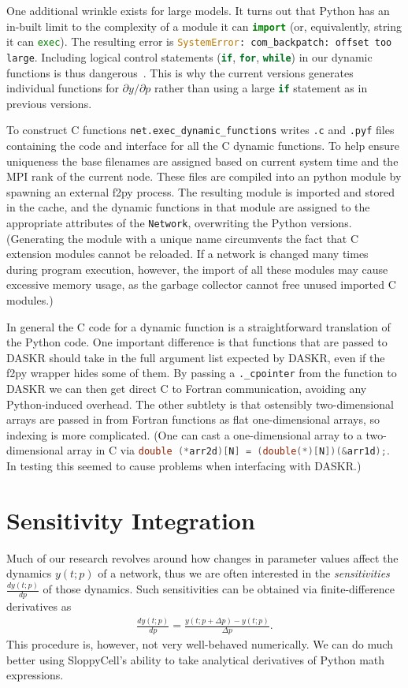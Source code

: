 \documentclass[12pt]{article}
\makeatletter
\newcommand{\py}[1]{\lstinline[language=Python, showstringspaces=False]@#1@}
\newcommand{\ccode}[1]{\lstinline[language=C, showstringspaces=False]!#1!}
\newcommand{\filename}[1]{\texttt{#1}}
\makeatother
\begin{document}
One additional wrinkle exists for large models.
It turns out that Python has an in-built limit to the complexity of a module it can \py{import} (or, equivalently, string it can \py{exec}).
The resulting error is \py{SystemError: com_backpatch: offset too large}.
Including logical control statements (\py{if}, \py{for}, \py{while}) in our dynamic functions is thus dangerous~\cite{bib:Reedy2006}.
This is why the current versions generates individual functions for $\partial y/\partial p$ rather than using a large \py{if} statement as in previous versions.

To construct C functions \py{net.exec_dynamic_functions} writes \filename{.c} and \filename{.pyf} files containing the code and interface for all the C dynamic functions.
To help ensure uniqueness the base filenames are assigned based on current system time and the MPI rank of the current node.
These files are compiled into an python module by spawning an external f2py process.
The resulting module is imported and stored in the cache, and the dynamic functions in that module are assigned to the appropriate attributes of the \py{Network}, overwriting the Python versions.
(Generating the module with a unique name circumvents the fact that C extension modules cannot be reloaded.
If a network is changed many times during program execution, however, the import of all these modules may cause excessive memory usage, as the garbage collector cannot free unused imported C modules.)

In general the C code for a dynamic function is a straightforward translation of the Python code.
One important difference is that functions that are passed to DASKR should take in the full argument list expected by DASKR, even if the f2py wrapper hides some of them.
By passing a \py{._cpointer} from the function to DASKR we can then get direct C to Fortran communication, avoiding any Python-induced overhead.
The other subtlety is that ostensibly two-dimensional arrays are passed in from Fortran functions as flat one-dimensional arrays, so indexing is more complicated.
(One can cast a one-dimensional array to a two-dimensional array in C via  \ccode{double (*arr2d)[N] = (double(*)[N])(&arr1d);}.
In testing this seemed to cause problems when interfacing with DASKR.)

\section{Sensitivity Integration}
Much of our research revolves around how changes in parameter values affect the dynamics $y(t; p)$ of a network, thus we are often interested in the \emph{sensitivities} $\frac{d y(t; p)}{dp}$ of those dynamics.
Such sensitivities can be obtained via finite-difference derivatives as
\begin{align}
\frac{d y(t; p)}{dp} = \frac{y(t; p + \Delta p) - y(t; p)}{\Delta p}.
\end{align}
This procedure is, however, not very well-behaved numerically.
We can do much better using SloppyCell's ability to take analytical derivatives of Python math expressions.
\end{document}
